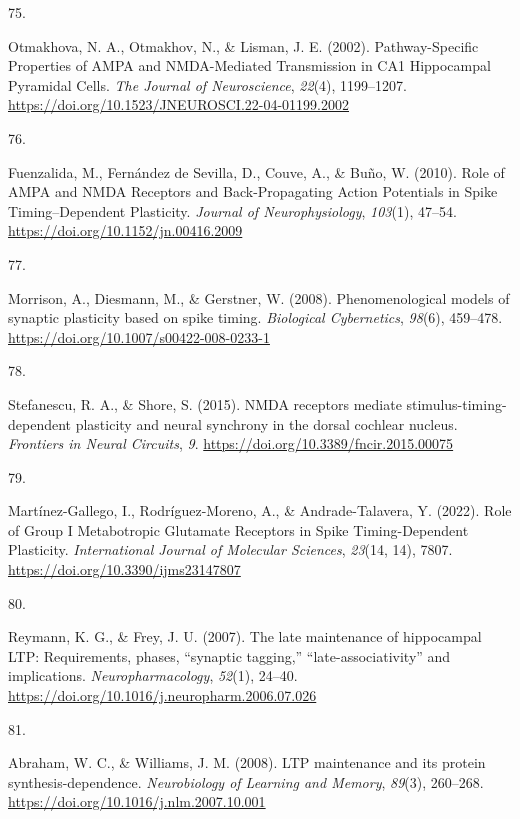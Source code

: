 \documentclass[
  11pt,
  letterpaper,
]{scrreprt}
\newlength{\cslhangindent}
\newlength{\csllabelwidth}
\newenvironment{CSLReferences}[2] %
 {\begin{list}{}{%
  \setlength{\itemindent}{0pt}
  \setlength{\leftmargin}{0pt}
  \setlength{\parsep}{0pt}
  \ifodd #1
   \setlength{\leftmargin}{\cslhangindent}
   \setlength{\itemindent}{-1\cslhangindent}
  \fi
  \setlength{\itemsep}{#2\baselineskip}}}
 {\end{list}}
\newcommand{\CSLLeftMargin}[1]{\parbox[t]{\csllabelwidth}{\strut#1\strut}}
\newcommand{\CSLRightInline}[1]{\parbox[t]{\linewidth - \csllabelwidth}{\strut#1\strut}}
\begin{document}
\begin{CSLReferences}{0}{0}
\CSLLeftMargin{75. }%
\CSLRightInline{Otmakhova, N. A., Otmakhov, N., \& Lisman, J. E. (2002).
Pathway-{Specific Properties} of {AMPA} and {NMDA-Mediated Transmission}
in {CA1 Hippocampal Pyramidal Cells}. \emph{The Journal of
Neuroscience}, \emph{22}(4), 1199--1207.
\url{https://doi.org/10.1523/JNEUROSCI.22-04-01199.2002}}

\CSLLeftMargin{76. }%
\CSLRightInline{Fuenzalida, M., Fernández de Sevilla, D., Couve, A., \&
Buño, W. (2010). Role of {AMPA} and {NMDA Receptors} and
{Back-Propagating Action Potentials} in {Spike Timing}--{Dependent
Plasticity}. \emph{Journal of Neurophysiology}, \emph{103}(1), 47--54.
\url{https://doi.org/10.1152/jn.00416.2009}}

\CSLLeftMargin{77. }%
\CSLRightInline{Morrison, A., Diesmann, M., \& Gerstner, W. (2008).
Phenomenological models of synaptic plasticity based on spike timing.
\emph{Biological Cybernetics}, \emph{98}(6), 459--478.
\url{https://doi.org/10.1007/s00422-008-0233-1}}

\CSLLeftMargin{78. }%
\CSLRightInline{Stefanescu, R. A., \& Shore, S. (2015). {NMDA} receptors
mediate stimulus-timing-dependent plasticity and neural synchrony in the
dorsal cochlear nucleus. \emph{Frontiers in Neural Circuits}, \emph{9}.
\url{https://doi.org/10.3389/fncir.2015.00075}}

\CSLLeftMargin{79. }%
\CSLRightInline{Martínez-Gallego, I., Rodríguez-Moreno, A., \&
Andrade-Talavera, Y. (2022). Role of {Group I Metabotropic Glutamate
Receptors} in {Spike Timing-Dependent Plasticity}. \emph{International
Journal of Molecular Sciences}, \emph{23}(14, 14), 7807.
\url{https://doi.org/10.3390/ijms23147807}}

\CSLLeftMargin{80. }%
\CSLRightInline{Reymann, K. G., \& Frey, J. U. (2007). The late
maintenance of hippocampal {LTP}: {Requirements}, phases, {``synaptic
tagging,''} {``late-associativity''} and implications.
\emph{Neuropharmacology}, \emph{52}(1), 24--40.
\url{https://doi.org/10.1016/j.neuropharm.2006.07.026}}

\CSLLeftMargin{81. }%
\CSLRightInline{Abraham, W. C., \& Williams, J. M. (2008). {LTP}
maintenance and its protein synthesis-dependence. \emph{Neurobiology of
Learning and Memory}, \emph{89}(3), 260--268.
\url{https://doi.org/10.1016/j.nlm.2007.10.001}}


\end{CSLReferences}
\end{document}
